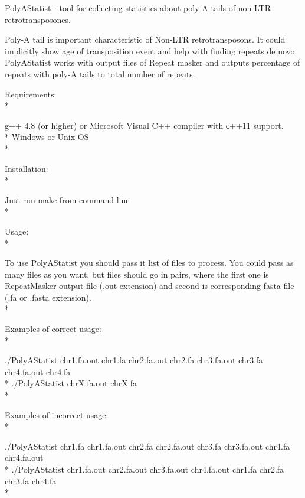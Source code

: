 \documentclass[12pt]{article}
\begin{document}
\begin{center}
\begin{Large}
PolyAStatist - tool for collecting statistics about poly-A tails of non-LTR retrotransposones.
\end{Large}
\end{center}

Poly-A tail is important characteristic of Non-LTR retrotransposons. It could implicitly show age of transposition event and help with finding repeats de novo.
PolyAStatist works with output files of Repeat masker and outputs percentage of repeats with poly-A tails to total number of repeats. \\

\begin{Large}
Requirements: \\*
\end{Large}
g++ 4.8 (or higher) or Microsoft Visual C++ compiler with с++11 support.  \\*
Windows or Unix OS\\*

\begin{Large}
Installation: \\*
\end{Large}
Just run make from command line \\*

\begin{Large}
Usage: \\*
\end{Large}
To use PolyAStatist you should pass it list of files to process. You could pass as many files as you want, but files should go in pairs, where the first one is RepeatMasker output file (.out extension) and second is corresponding fasta file (.fa or .fasta extension). \\*

\begin{Large}
Examples of correct usage: \\*
\end{Large}
./PolyAStatist chr1.fa.out chr1.fa chr2.fa.out chr2.fa chr3.fa.out  chr3.fa chr4.fa.out chr4.fa \\*
./PolyAStatist chrX.fa.out chrX.fa \\*

\begin{Large}
Examples of incorrect usage: \\*
\end{Large}
./PolyAStatist chr1.fa chr1.fa.out  chr2.fa chr2.fa.out chr3.fa chr3.fa.out  chr4.fa chr4.fa.out \\*
./PolyAStatist chr1.fa.out chr2.fa.out chr3.fa.out chr4.fa.out chr1.fa chr2.fa chr3.fa chr4.fa \\*
\end{document}
